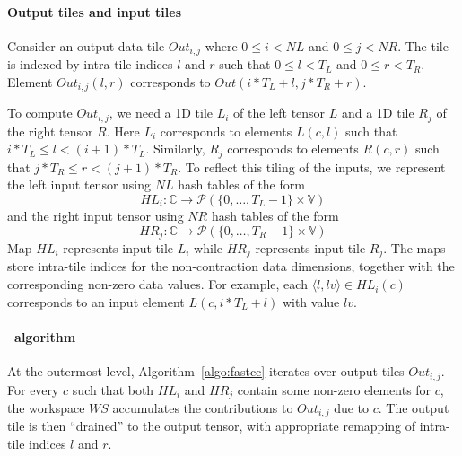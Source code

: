 
\paragraph{Output tiles and input tiles}
Consider an output data tile $\mathit{Out}_{i,j}$ where $0\le i < \mathit{NL}$ and $0\le j < \mathit{NR}$. The tile is indexed by intra-tile indices $l$ and $r$ such that $0 \le l < \mathit{T_L}$ and $0 \le r < \mathit{T_R}$. Element $\mathit{Out}_{i,j}(l,r)$ corresponds to 
$\mathit{Out}(i\ast \mathit{T_L}+l,j \ast \mathit{T_R} + r)$. 

To compute $\mathit{Out}_{i,j}$, we need a 1D tile $L_i$ of the left tensor $L$ and a 1D tile $R_j$ of the right tensor $R$. Here $L_i$ corresponds to elements $L(c,l)$ such that $i\ast \mathit{T_L} \le l < (i+1) \ast \mathit{T_L}$. Similarly, $R_j$ corresponds to elements $R(c,r)$ such that $j\ast \mathit{T_R} \le r < (j+1) \ast \mathit{T_R}$. To reflect this tiling of the inputs,
we represent the left input tensor using $\mathit{NL}$ hash tables of the form 
$$\mathit{HL}_i: \mathbb{C} \rightarrow \mathcal{P}(\{ 0, \ldots, \mathit{T_L} -1\} \times \mathbb{V})$$ 
and the right input tensor using $\mathit{NR}$ hash tables of the form 
$$\mathit{HR}_j: \mathbb{C} \rightarrow \mathcal{P}(\{ 0, \ldots, \mathit{T_R} -1\} \times \mathbb{V})$$ 
Map $\mathit{HL}_i$ represents input tile $L_i$ while $\mathit{HR}_j$ represents input tile $R_j$. The maps store intra-tile indices for the non-contraction data dimensions, together with the corresponding non-zero data values. For example, each $\langle l,\mathit{lv} \rangle \in \mathit{HL}_i(c)$ corresponds to an input element $L(c,i\ast \mathit{T_L}+l)$ with value $\mathit{lv}$. 

\paragraph{\ourtool \ algorithm} At the outermost level, Algorithm~\ref{algo:fastcc} iterates over output tiles $\mathit{Out}_{i,j}$. 
For every $c$ such that both 
$\mathit{HL}_i$ and $\mathit{HR}_j$ contain some non-zero elements for $c$, the workspace $\mathit{WS}$ accumulates the contributions to $\mathit{Out}_{i,j}$ due to $c$. The output tile is then ``drained'' to the output tensor, with appropriate remapping of intra-tile indices $l$ and $r$. 


